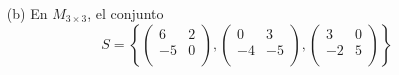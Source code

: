 \begin{itemize}
    \item[(b)] En $ M_{3 \times 3}$, el conjunto
    \begin{equation}
        S = \left\{
            \begin{pmatrix}
                6 & 2 \\
                -5 & 0 \\
            \end{pmatrix},         
            \begin{pmatrix}
                0 & 3 \\
                -4 & -5 \\
            \end{pmatrix},        
            \begin{pmatrix}
                3 & 0 \\
                -2 & 5 \\
            \end{pmatrix}
            \right\}
    \end{equation}







    
\end{itemize}